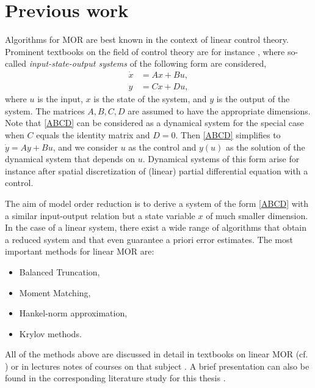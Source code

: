\section{Previous work}
Algorithms for MOR are best known in the context of linear control theory. Prominent textbooks on the field of control theory are for instance \cite{M04,Polderman1998,TSH01}, where so-called \textit{input-state-output systems} of the following form are considered,
\begin{equation}
\begin{split}
\label{ABCD}
\dot{x} &= A x + B u, \\
y &= C x + D u ,
\end{split}
\end{equation}
where $u$ is the input, $x$ is the state of the system, and $y$ is the output of the system. The matrices $A,B,C,D$ are assumed to have the appropriate dimensions. Note that \eqref{ABCD} can be considered as a dynamical system for the special case when $C$ equals the identity matrix and $D = 0$. Then \eqref{ABCD} simplifies to $\dot{y} = A y + B u$, and we consider $u$ as the control and $y(u)$ as the solution of the dynamical system that depends on $u$. Dynamical systems of this form arise for instance after spatial discretization of (linear) partial differential equation with a control.

The aim of model order reduction is to derive a system of the form \eqref{ABCD} with a similar input-output relation but a state variable $x$ of much smaller dimension. In the case of a linear system, there exist a wide range of algorithms that obtain a reduced system and that even guarantee a priori error estimates. The most important methods for linear MOR are:
\begin{itemize}
  \item Balanced Truncation,
  \item Moment Matching,
  \item Hankel-norm approximation,
  \item Krylov methods.
\end{itemize}
All of the methods above are discussed in detail in textbooks on linear MOR (cf. \cite{A05,SVR08}) or in lectures notes of courses on that subject \cite{R12}. A brief presentation can also be found in the corresponding literature study for this thesis \cite{B13}.

